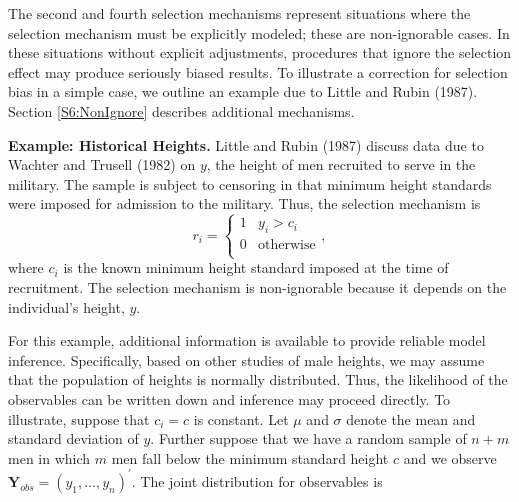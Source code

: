 \linejed

\bigskip

The second and fourth selection mechanisms represent situations
where the selection mechanism must be explicitly modeled; these are
non-ignorable cases. In these situations without explicit
adjustments, procedures that ignore the selection effect may produce
seriously biased results. To illustrate a correction for selection
bias in a simple case, we outline an example due to Little and Rubin
(1987). Section \ref{S6:NonIgnore} describes additional mechanisms.

\linejed{}

\textbf{Example: Historical Heights.} Little and Rubin (1987) discuss data due to Wachter and
Trusell (1982) on $y$, the height of men recruited to serve in the
military. The sample is subject to censoring in that minimum height
standards were imposed for admission to the military. Thus, the
selection mechanism is
\begin{equation*}
r_i = \left\{
              \begin{array}{ll}
                1 & y_i > c_i \\
                0 & \mathrm{otherwise} \\
              \end{array}
            \right. ,
\end{equation*}
where $c_i$ is the known minimum height standard imposed at the time
of recruitment. The selection mechanism is non-ignorable because it
depends on the individual's height, $y$.

For this example, additional information is available to provide
reliable model inference. Specifically, based on other studies of
male heights, we may assume that the population of heights is
normally distributed. Thus, the likelihood of the observables can be
written down and inference may proceed directly. To illustrate,
suppose that $c_i = c$ is constant. Let $\mu$ and $\sigma$ denote
the mean and standard deviation of $y$. Further suppose that we have
a random sample of $n + m$ men in which $m$ men fall below the
minimum standard height $c$ and we observe $\mathbf{Y}_{obs} = (y_1,
\ldots, y_n)^{\prime} $. The joint distribution for observables is

